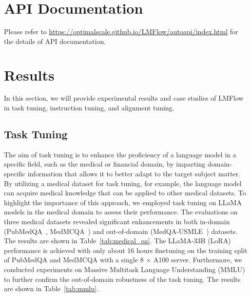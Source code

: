 \documentclass[11pt]{article}
\begin{document}
\section{API Documentation}
Please refer to \url{https://optimalscale.github.io/LMFlow/autoapi/index.html} for the details of API documentation.


\section{Results}
In this section, we will provide experimental results and case studies of LMFlow in task tuning, instruction tuning, and alignment tuning.

\subsection{Task Tuning}
The aim of task tuning is to enhance the proficiency of a language model in a specific field, such as the medical or financial domain, by imparting domain-specific information that allows it to better adapt to the target subject matter.
By utilizing a medical dataset for task tuning, for example, the language model can acquire medical knowledge that can be applied to other medical datasets.
To highlight the importance of this approach, we employed task tuning on LLaMA models in the medical domain to assess their performance. 
The evaluations on three medical datasets revealed significant enhancements in both in-domain (PubMedQA~\citep{jin2019pubmedqa}, MedMCQA~\citep{pal2022medmcqa}) and out-of-domain (MedQA-USMLE~\citep{jin2021disease}) datasets.
The results are shown in Table~\ref{tab:medical_qa}.
The LLaMA-33B (LoRA) performance is achieved with only about 16 hours finetuning on the training split of PubMedQA and MedMCQA with a single 8 $\times$ A100 server. 
Furthermore, we conducted experiments on Massive Multitask Language Understanding (MMLU)~\citep{hendrycks2020measuring} to further confirm the out-of-domain robustness of the task tuning.
The results are shown in Table~\ref{tab:mmlu}.
\end{document}
